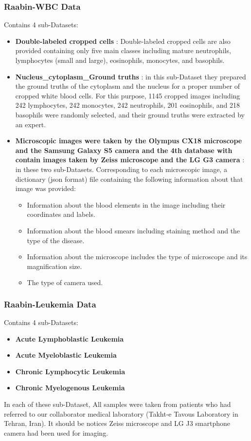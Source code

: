 \subsubsection{Raabin-WBC Data}
\hspace{\parindent}
Contains 4 sub-Datasets:
\begin{itemize}
    \item \textbf{Double-labeled cropped cells} : Double-labeled cropped cells are also provided containing only five main classes including mature neutrophils, lymphocytes (small and large), eosinophils, monocytes, and basophils. 
    \item \textbf{Nucleus\_cytoplasm\_Ground truths} : in this sub-Dataset they prepared the ground truths of the cytoplasm and the nucleus for a proper number of cropped white blood cells. For this purpose, 1145 cropped images including 242 lymphocytes, 242 monocytes, 242 neutrophils, 201 eosinophils, and 218 basophils were randomly selected, and their ground truths were extracted by an expert.
    \item \textbf{Microscopic images were taken by the Olympus CX18 microscope and the Samsung Galaxy S5 camera and the 4th database with contain images taken by Zeiss microscope and the LG G3 camera } : in these two sub-Datasets. Corresponding to each microscopic image, a dictionary (json format) file containing the following information about that image was provided:
    \begin{itemize}
        \item Information about the blood elements in the image including their coordinates and labels.
        \item Information about the blood smears including staining method and the type of the disease.
        \item Information about the microscope includes the type of microscope and its magnification size.
        \item The type of camera used.
    \end{itemize}
\end{itemize}

\subsubsection{Raabin-Leukemia Data}
\hspace{\parindent}
Contains 4 sub-Datasets:
\begin{itemize}
    \item \textbf{Acute Lymphoblastic Leukemia}
    \item \textbf{Acute Myeloblastic Leukemia} 
    \item \textbf{Chronic Lymphocytic Leukemia}
    \item \textbf{Chronic Myelogenous Leukemia}
\end{itemize}
In each of these sub-Dataset, All samples were taken from patients who had referred to our collaborator medical laboratory (Takht-e Tavous Laboratory in Tehran, Iran). It should be notices Zeiss microscope and LG J3 smartphone camera had been used for imaging.

